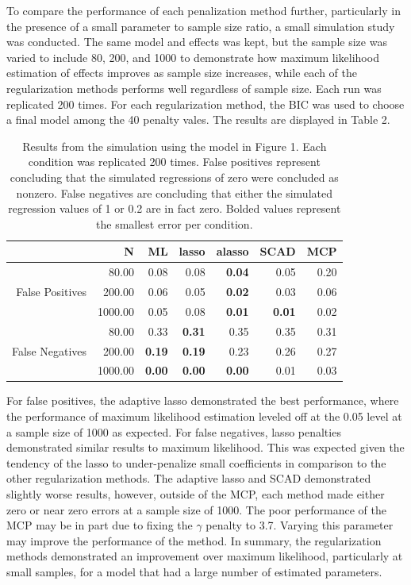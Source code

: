 \documentclass[article]{jss}
\begin{document}
To compare the performance of each penalization method further,
particularly in the presence of a small parameter to sample size ratio,
a small simulation study was conducted. The same model and effects was
kept, but the sample size was varied to include 80, 200, and 1000 to
demonstrate how maximum likelihood estimation of effects improves as
sample size increases, while each of the regularization methods performs
well regardless of sample size. Each run was replicated 200 times. For
each regularization method, the BIC was used to choose a final model
among the 40 penalty vales. The results are displayed in Table 2.

\begin{table}[ht]
\centering
\begin{tabular}{rrrrrrr}
  \hline
 & N & ML & lasso & alasso & SCAD & MCP \\ 
  \hline
 & 80.00 & 0.08 & 0.08 & \textbf{0.04} & 0.05 & 0.20 \\ 
  False Positives & 200.00 & 0.06 & 0.05 & \textbf{0.02} & 0.03 & 0.06 \\ 
   & 1000.00 & 0.05 & 0.08 & \textbf{0.01} & \textbf{0.01} & 0.02 \\ 
   & 80.00 & 0.33 & \textbf{0.31} & 0.35 & 0.35 & 0.31 \\ 
  False Negatives & 200.00 & \textbf{0.19} & \textbf{0.19} & 0.23 & 0.26 & 0.27 \\ 
   & 1000.00 & \textbf{0.00} & \textbf{0.00} & \textbf{0.00} & 0.01 & 0.03 \\ 
   \hline
\end{tabular}
    \caption{Results from the simulation using the model in Figure 1. Each condition was replicated 200 times. False positives represent concluding that the simulated regressions of zero were concluded as nonzero. False negatives are concluding that either the simulated regression values of 1 or 0.2 are in fact zero. Bolded values represent the smallest error per condition.}
\end{table}

For false positives, the adaptive lasso demonstrated the best
performance, where the performance of maximum likelihood estimation
leveled off at the 0.05 level at a sample size of 1000 as expected. For
false negatives, lasso penalties demonstrated similar results to maximum
likelihood. This was expected given the tendency of the lasso to
under-penalize small coefficients in comparison to the other
regularization methods. The adaptive lasso and SCAD demonstrated
slightly worse results, however, outside of the MCP, each method made
either zero or near zero errors at a sample size of 1000. The poor
performance of the MCP may be in part due to fixing the \(\gamma\)
penalty to 3.7. Varying this parameter may improve the performance of
the method. In summary, the regularization methods demonstrated an
improvement over maximum likelihood, particularly at small samples, for
a model that had a large number of estimated parameters.
\end{document}
